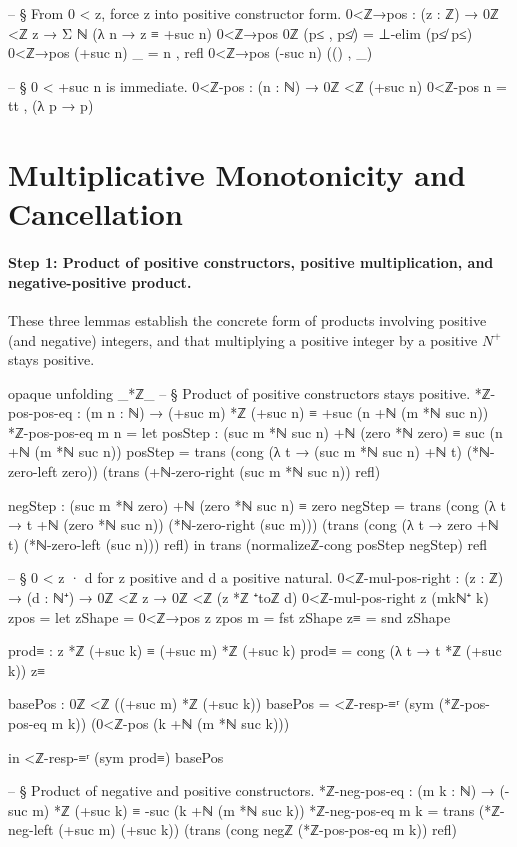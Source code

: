 \documentclass[11pt,a4paper]{book}
\def\mathbb#1{#1}%
\begin{document}
\begin{code}
-- § From 0 < z, force z into positive constructor form.
0<ℤ→pos : (z : ℤ) → 0ℤ <ℤ z → Σ ℕ (λ n → z ≡ +suc n)
0<ℤ→pos 0ℤ (p≤ , p≰) = ⊥-elim (p≰ p≤)
0<ℤ→pos (+suc n) _ = n , refl
0<ℤ→pos (-suc n) (() , _)

-- § 0 < +suc n is immediate.
0<ℤ-pos : (n : ℕ) → 0ℤ <ℤ (+suc n)
0<ℤ-pos n = tt , (λ p → p)
\end{code}

\section{Multiplicative Monotonicity and Cancellation}

\paragraph{Step 1: Product of positive constructors, positive multiplication, and negative-positive product.}
These three lemmas establish the concrete form of products involving positive (and negative) integers, and that multiplying a positive integer by a positive $\mathbb{N}^+$ stays positive.

\begin{code}
opaque
  unfolding _*ℤ_
  -- § Product of positive constructors stays positive.
  *ℤ-pos-pos-eq : (m n : ℕ) → (+suc m) *ℤ (+suc n) ≡ +suc (n +ℕ (m *ℕ suc n))
  *ℤ-pos-pos-eq m n =
    let posStep : (suc m *ℕ suc n) +ℕ (zero *ℕ zero) ≡ suc (n +ℕ (m *ℕ suc n))
        posStep =
          trans
            (cong (λ t → (suc m *ℕ suc n) +ℕ t) (*ℕ-zero-left zero))
            (trans
              (+ℕ-zero-right (suc m *ℕ suc n))
              refl)

        negStep : (suc m *ℕ zero) +ℕ (zero *ℕ suc n) ≡ zero
        negStep =
          trans
            (cong (λ t → t +ℕ (zero *ℕ suc n)) (*ℕ-zero-right (suc m)))
            (trans
              (cong (λ t → zero +ℕ t) (*ℕ-zero-left (suc n)))
              refl)
    in
    trans
      (normalizeℤ-cong posStep negStep)
      refl

-- § 0 < z · d for z positive and d a positive natural.
0<ℤ-mul-pos-right : (z : ℤ) → (d : ℕ⁺) → 0ℤ <ℤ z → 0ℤ <ℤ (z *ℤ ⁺toℤ d)
0<ℤ-mul-pos-right z (mkℕ⁺ k) zpos =
  let zShape = 0<ℤ→pos z zpos
      m = fst zShape
      z≡ = snd zShape

      prod≡ : z *ℤ (+suc k) ≡ (+suc m) *ℤ (+suc k)
      prod≡ = cong (λ t → t *ℤ (+suc k)) z≡

      basePos : 0ℤ <ℤ ((+suc m) *ℤ (+suc k))
      basePos =
        <ℤ-resp-≡ʳ (sym (*ℤ-pos-pos-eq m k)) (0<ℤ-pos (k +ℕ (m *ℕ suc k)))

  in
  <ℤ-resp-≡ʳ (sym prod≡) basePos

-- § Product of negative and positive constructors.
*ℤ-neg-pos-eq : (m k : ℕ) → (-suc m) *ℤ (+suc k) ≡ -suc (k +ℕ (m *ℕ suc k))
*ℤ-neg-pos-eq m k =
  trans
    (*ℤ-neg-left (+suc m) (+suc k))
    (trans
      (cong negℤ (*ℤ-pos-pos-eq m k))
      refl)
\end{code}
\end{document}
